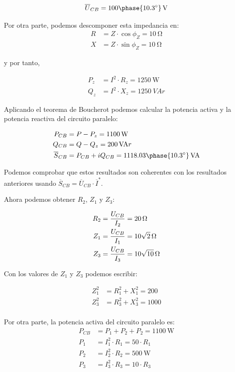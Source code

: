 \documentclass[12pt]{article}
\begin{document}
\begin{enumerate}[resume]
\[
\overline{U}_{CB} = \SI[parse-numbers=false]{100\phase{\ang{10.3}}}{\V}
\]

Por otra parte, podemos descomponer esta impedancia en:
\begin{align*}
  R &= Z \cdot \cos \phi_Z = \SI{10}{\ohm}\\
  X &= Z \cdot \sin \phi_Z = \SI{10}{\ohm}
\end{align*}

y por tanto,

\begin{align*}
P_z &= I^2 \cdot R_z = \SI{1250}{\watt}\\
Q_z &= I^2 \cdot X_z = \SI{1250}{VA}r
\end{align*}

Aplicando el teorema de Boucherot podemos calcular la potencia activa
y la potencia reactiva del circuito paralelo:

\begin{align*}
P_{CB} &= P - P_z = \SI{1100}{\watt}\\
Q_{CB} &= Q - Q_z = \SI{200}{VA}r\\
\overline{S}_{CB} &= P_{CB} + i Q_{CB} = \SI[parse-numbers=false]{1118.03\phase{\ang{10.3}}}{VA}
\end{align*}

Podemos comprobar que estos resultados son coherentes con los
resultados anteriores usando $\overline{S}_{CB} = \overline{U}_{CB}
\cdot \overline{I}^*$.


Ahora podemos obtener $R_2$, $Z_1$ y $Z_3$:

\begin{align*}
  R_2 &= \frac{U_{CB}}{I_2} = \SI{20}{\ohm}\\
  Z_1 &= \frac{U_{CB}}{I_1} = \SI[parse-numbers=false]{10\sqrt{2}}{\ohm}\\
  Z_3 &= \frac{U_{CB}}{I_3} = \SI[parse-numbers=false]{10\sqrt{10}}{\ohm}
\end{align*}

Con los valores de $Z_1$ y $Z_3$ podemos escribir:

\begin{align*}
  Z_1^2 &= R_1^2 + X_1^2 = 200\\
  Z_3^2 &= R_3^2 + X_3^2 = 1000\\
\end{align*}

Por otra parte, la potencia activa del circuito paralelo es:
\begin{align*}
  P_{CB} &= P_1 + P_2 + P_2 =\SI{1100}{\watt}\\
  P_1 &= I_1^2 \cdot R_1 = 50 \cdot R_1\\
  P_2 &= I_2^2 \cdot R_2 = \SI{500}{\watt}\\
  P_3 &= I_3^2 \cdot R_3 = 10 \cdot R_3
\end{align*}


\end{enumerate}
\end{document}
